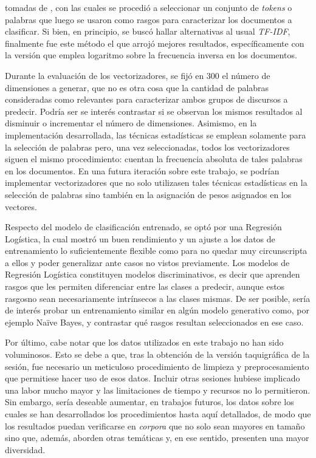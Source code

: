 tomadas de \cite{monroe2008fightin}, con las cuales se procedi\'o
a seleccionar un conjunto de \textit{tokens} o palabras que luego
se usaron como rasgos para caracterizar los documentos a clasificar.
Si bien, en principio, se busc\'o hallar alternativas al usual
\textit{TF-IDF}, finalmente fue este
método el que arroj\'o mejores resultados, específicamente con la
versi\'on que emplea logaritmo sobre la frecuencia inversa en los
documentos.
\par
Durante la evaluaci\'on de los vectorizadores, se fij\'o en $300$
el n\'umero de dimensiones a generar, que no es otra cosa que la
cantidad de palabras consideradas como relevantes para caracterizar
ambos grupos de discursos a predecir. Podr\'ia ser se inter\'es
contrastar si se observan los mismos resultados al disminuir o
incrementar el n\'umero de dimensiones. Asimismo, en la implementación
desarrollada, las t\'ecnicas estad\'isticas se emplean solamente
para la selecci\'on de palabras pero, una vez seleccionadas, todos
los vectorizadores siguen el mismo procedimiento: cuentan la frecuencia
absoluta de tales palabras en los documentos. En una futura iteraci\'on
sobre este trabajo, se podr\'ian implementar vectorizadores que
no solo utilizasen tales t\'ecnicas estad\'isticas en la selecci\'on
de palabras sino tambi\'en en la asignación de pesos asignados
en los vectores.
\par
Respecto del modelo de clasificaci\'on entrenado, se opt\'o
por una Regresi\'on Log\'istica, la cual mostr\'o un buen
rendimiento y un ajuste a los datos de entrenamiento lo suficientemente
flexible como para no quedar muy circunscripta a ellos y poder
generalizar ante casos no vistos previamente. Los modelos de
Regresi\'on Log\'istica constituyen modelos discriminativos, es decir
que aprenden rasgos que les permiten diferenciar entre las clases
a predecir, aunque estos rasgosno sean necesariamente intrínsecos
a las clases mismas. De ser posible, sería de interés probar
un entrenamiento similar en algún modelo generativo como, por ejemplo
Naïve Bayes, y contrastar qu\'e rasgos resultan seleccionados en ese caso.
\par
Por \'ultimo, cabe notar que los datos utilizados en este trabajo
no han sido voluminosos. Esto se debe a que, tras la obtenci\'on
de la versi\'on taquigr\'afica de la sesi\'on, fue necesario un
meticuloso procedimiento de limpieza y preprocesamiento que permitiese
hacer uso de esos datos. Incluir otras sesiones hubiese implicado
una labor mucho mayor y las limitaciones de tiempo y recursos no
lo permitieron. Sin embargo, ser\'ia deseable aumentar, en trabajos
futuros, los datos sobre los cuales se han desarrollados los procedimientos
hasta aqu\'i detallados, de modo que los resultados puedan verificarse en
\textit{corpora} que no solo sean mayores en tamaño sino que, adem\'as,
aborden otras tem\'aticas y, en ese sentido, presenten una mayor
diversidad.
